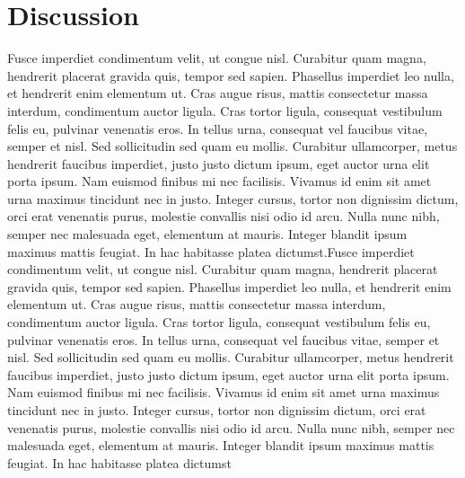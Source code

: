 \documentclass[letterpaper]{article}
\begin{document}
\section{Discussion}
Fusce imperdiet condimentum velit, ut congue nisl. Curabitur quam magna, hendrerit placerat gravida quis, tempor sed sapien. Phasellus imperdiet leo nulla, et hendrerit enim elementum ut. Cras augue risus, mattis consectetur massa interdum, condimentum auctor ligula. Cras tortor ligula, consequat vestibulum felis eu, pulvinar venenatis eros. In tellus urna, consequat vel faucibus vitae, semper et nisl. Sed sollicitudin sed quam eu mollis. Curabitur ullamcorper, metus hendrerit faucibus imperdiet, justo justo dictum ipsum, eget auctor urna elit porta ipsum. Nam euismod finibus mi nec facilisis. Vivamus id enim sit amet urna maximus tincidunt nec in justo. Integer cursus, tortor non dignissim dictum, orci erat venenatis purus, molestie convallis nisi odio id arcu. Nulla nunc nibh, semper nec malesuada eget, elementum at mauris. Integer blandit ipsum maximus mattis feugiat. In hac habitasse platea dictumst.Fusce imperdiet condimentum velit, ut congue nisl. Curabitur quam magna, hendrerit placerat gravida quis, tempor sed sapien. Phasellus imperdiet leo nulla, et hendrerit enim elementum ut. Cras augue risus, mattis consectetur massa interdum, condimentum auctor ligula. Cras tortor ligula, consequat vestibulum felis eu, pulvinar venenatis eros. In tellus urna, consequat vel faucibus vitae, semper et nisl. Sed sollicitudin sed quam eu mollis. Curabitur ullamcorper, metus hendrerit faucibus imperdiet, justo justo dictum ipsum, eget auctor urna elit porta ipsum. Nam euismod finibus mi nec facilisis. Vivamus id enim sit amet urna maximus tincidunt nec in justo. Integer cursus, tortor non dignissim dictum, orci erat venenatis purus, molestie convallis nisi odio id arcu. Nulla nunc nibh, semper nec malesuada eget, elementum at mauris. Integer blandit ipsum maximus mattis feugiat. In hac habitasse platea dictumst%


%
%
\end{document}
